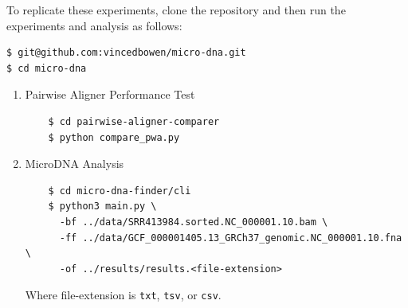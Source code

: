 \documentclass[11pt, letterpaper]{article}
\begin{document}
To replicate these experiments, clone the repository and then run the
experiments and analysis as follows:
\begin{verbatim}
$ git@github.com:vincedbowen/micro-dna.git
$ cd micro-dna
\end{verbatim}
\begin{enumerate}
    \item Pairwise Aligner Performance Test 
    \begin{verbatim}
    $ cd pairwise-aligner-comparer
    $ python compare_pwa.py
    \end{verbatim}
    \item MicroDNA Analysis
    \begin{verbatim}
    $ cd micro-dna-finder/cli
    $ python3 main.py \
      -bf ../data/SRR413984.sorted.NC_000001.10.bam \
      -ff ../data/GCF_000001405.13_GRCh37_genomic.NC_000001.10.fna \
      -of ../results/results.<file-extension>
    \end{verbatim}
    Where file-extension is \verb|txt|, \verb|tsv|, or \verb|csv|.
\end{enumerate}
\end{document}
